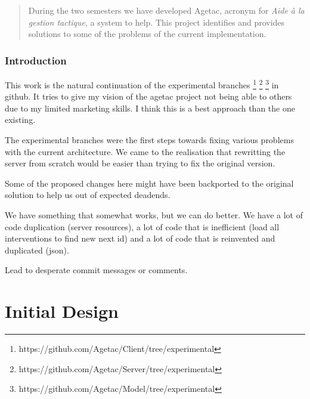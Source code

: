 \documentclass[12pt]{scrartcl}
\begin{document}
\maketitle

\begin{abstract}
During the two semesters we have developed Agetac, acronym for \emph{Aide à la gestion tactique}, a system to help. This project identifies and provides solutions to some of the problems of the current implementation.
\end{abstract}

\thispagestyle{empty} %
\newpage
{} %

\tableofcontents
\newpage

\section*{Introduction}

This work is the natural continuation of the experimental branches \footnote{https://github.com/Agetac/Client/tree/experimental} \footnote{https://github.com/Agetac/Server/tree/experimental} \footnote{https://github.com/Agetac/Model/tree/experimental} in github. It tries to give my vision of the agetac project not being able to others due to my limited marketing skills. I think this is a best approach than the one existing.

The experimental branches were the first steps towards fixing various problems with the current architecture. We came to the realisation that rewritting the server from scratch would be easier than trying to fix the original version.

Some of the proposed changes here might have been backported to the original solution to help us out of expected deadends.

We have something that somewhat works, but we can do better. We have a lot of code duplication (server resources), a lot of code that is inefficient (load all interventions to find new next id) and a lot of code that is reinvented and duplicated (json).

Lead to desperate commit messages or comments.

\newpage
\part{Initial Design}

\end{document}
